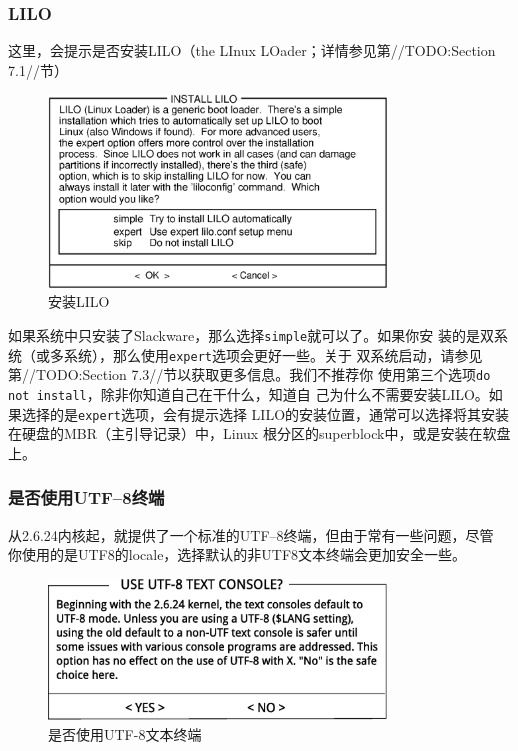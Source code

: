 \subsubsection{LILO}
\label{sec:installation:setup:configure:lilo}
这里，会提示是否安装LILO（the LInux LOader；详情参见第//TODO:Section
7.1//节）
\begin{figure}[htpb]
  \centering
  \includegraphics[width=0.8\textwidth]{images/installation/setup-lilo.eps}
  \caption{安装LILO}
  \label{fig:set-lilo}
\end{figure}
如果系统中只安装了Slackware，那么选择\texttt{simple}就可以了。如果你安
装的是双系统（或多系统），那么使用\texttt{expert}选项会更好一些。关于
双系统启动，请参见第//TODO:Section 7.3//节以获取更多信息。我们不推荐你
使用第三个选项\texttt{do not install}，除非你知道自己在干什么，知道自
己为什么不需要安装LILO。如果选择的是\texttt{expert}选项，会有提示选择
LILO的安装位置，通常可以选择将其安装在硬盘的MBR（主引导记录）中，Linux
根分区的superblock中，或是安装在软盘上。

\subsubsection{是否使用UTF--8终端}
\label{sec:installation:setup:configure:utf8console}
从2.6.24内核起，就提供了一个标准的UTF--8终端，但由于常有一些问题，尽管
你使用的是UTF8的locale，选择默认的非UTF8文本终端会更加安全一些。
\begin{figure}[htpb]
  \centering
  \includegraphics[width=0.8\textwidth]{images/installation/use-utf8-text-console.eps}
  \caption{是否使用UTF-8文本终端}
  \label{fig:use-utf8-text-console}
\end{figure}

